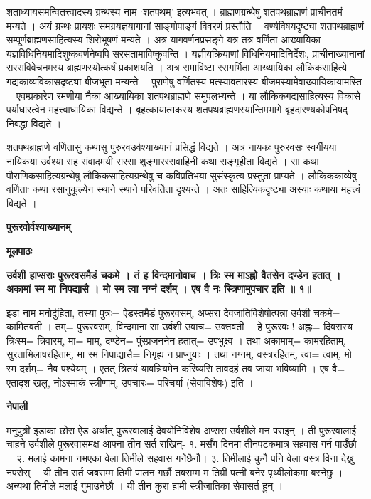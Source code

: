 \documentclass[11pt, a5paper]{article}
\begin{document}
शताध्यायसमन्वितत्त्वादस्य ग्रन्थस्य नाम ‘शतपथम्’ इत्यभवत् । ब्राह्मणग्रन्थेषु शतपथब्राह्मणं प्राचीनतमं मन्यते । अयं ग्रन्थः प्रायशः समग्रयज्ञयागानां साङ्गोपाङ्गं विवरणं प्रस्तौति । वर्ण्यविषयदृष्ट्या शतपथब्राह्मणं सम्पूर्णब्राह्मणसाहित्यस्य शिरोभूषणं मन्यते । अत्र यागवर्णनप्रसङ्गे यत्र तत्र वर्णिता आख्यायिका यज्ञविधिनियमादिशुष्कवर्णनेष्वपि सरसतामाविष्कुवन्ति । यज्ञीयक्रियाणां विधिनियमादिनिर्देशः, प्राचीनाख्यानानां सरसविवेचनमस्य ब्राह्मणस्योत्कर्षं प्रकाशयति । अत्र समाविष्टा रसगर्भिता आख्यायिका लौकिकसाहित्ये गद्यकाव्यविकासदृष्ट्या बीजभूता मन्यन्ते । पुराणेषु वर्णितस्य मत्स्यावतारस्य बीजमस्यामेवाख्यायिकायामस्ति । एवम्प्रकारेण रमणीया नैका आख्यायिका शतपथब्राह्मणे समुपलभ्यन्ते । या लौकिकगद्यसाहित्यस्य विकासे पर्याधारत्वेन महत्त्वाधायिका विद्यन्ते । बृहत्कायात्मकस्य शतपथब्राह्मणस्यान्तिमभागे बृहदारण्यकोपनिषद् निबद्धा विद्यते ।

शतपथब्राह्मणे वर्णितासु कथासु पुरुरवउर्वश्याख्यानं प्रसिद्धं विद्यते । अत्र नायकः पुरुरवसः स्वर्गीयया नायिकया उर्वश्या सह संवादमयी सरसा शृ्ङ्गाररसवाहिनी कथा सङ्‌गृहीता विद्यते । सा कथा पौराणिकसाहित्यग्रन्थेषु लौकिकसाहित्यग्रन्थेषु च कविप्रतिभया सुसंस्कृत्य प्रस्तुता प्राप्यते । लौकिककाव्येषु वर्णिताः कथा रसानुकूल्येन स्थाने स्थाने परिवर्तिता दृश्यन्ते । अतः साहित्यिकदृष्ट्या अस्याः कथाया महत्त्वं विद्यते ।

\textbf{पुरूरवोर्वश्याख्यानम्}

\textbf{मूलपाठः}

\textbf{उर्वशी हाप्सराः पुरूरवसमैडं चकमे । तं ह विन्दमानोवाच । त्रिः स्म माऽह्नो वैतसेन दण्डेन हतात् । अकामां स्म मा निपद्यासै । मो स्म त्वा नग्नं दर्शम् । एष वै नः स्त्रिणामुपचार इति ॥ १॥}

इडा नाम मनोर्दुहिता, तस्या पुत्रः= ऐडस्तमैडं पुरूरवसम्, अप्सरा देवजातिविशेषोत्पन्ना उर्वशी चकमे= कामितवती । तम्= पुरूरवसम्, विन्दमाना सा उर्वशी उवाच= उक्तवती । हे पुरूरवः ! अह्नः= दिवसस्य त्रिःस्म= त्रिवारम्, मा= माम्, दण्डेन= पुंस्प्रजननेन हतात्= उपभुक्ष्व । तथा अकामाम्= कामरहिताम्, सुरताभिलाषरहिताम्, मा स्म निपाद्यासै= निगृह्य न प्राप्नुयाः । तथा नग्नम्, वस्त्ररहितम्, त्वा= त्वाम्, मो स्म दर्शम्= नैव पश्येयम् । एतत् त्रितयं यावन्नियमेन करिष्यसि तावदहं तव जाया भविष्यामि । एष वै= एतादृश खलु, नोऽस्माकं स्त्रीणाम्, उपचारः= परिचर्या (सेवाविशेषः) इति ।

\textbf{नेपाली}

मनुपुत्री इडाका छोरा ऐड अर्थात् पुरूरवालाई देवयोनिविशेष अप्सरा उर्वशीले मन पराइन् । ती पुरूरवालाई चाहने उर्वशीले पुरूरवासमक्ष आफ्ना तीन सर्त राखिन्- १. मसँग दिनमा तीनपटकमात्र सहवास गर्न पाउँछौ । २. मलाई कामना नभएका वेला तिमीले सहवास गर्नेछैनौ। ३. तिमीलाई कुनै पनि वेला वस्त्र विना देख्नु नपरोस् । यी तीन सर्त जबसम्म तिमी पालन गर्छौ तबसम्म म तिम्री पत्नी बनेर पृथ्वीलोकमा बस्नेछु । अन्यथा तिमीले मलाई गुमाउनेछौ । यी तीन कुरा हामी स्त्रीजातिका सेवासर्त हुन् ।
\end{document}
